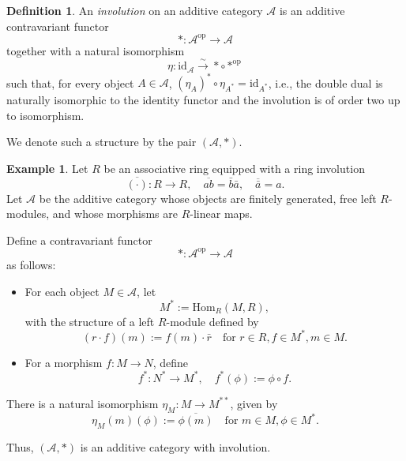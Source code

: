 \documentclass{article}
\theoremstyle{definition}
\newtheorem{defn}[theorem]{Definition}
\newtheorem{exmp}[theorem]{Example}
\begin{document}
\begin{defn}

An \emph{involution} on an additive category \( \mathcal{A} \) is an additive contravariant functor
\[
    * : \mathcal{A}^{\mathrm{op}} \to \mathcal{A}
\]
together with a natural isomorphism
\[
    \eta: \mathrm{id}_{\mathcal{A}} \xrightarrow{\sim} * \circ *^{\mathrm{op}}
\]
such that, for every object \( A \in \mathcal{A} \),  \( (\eta_{A})^* \circ \eta_{A^*} = \mathrm{id}_{A^*} \), i.e., the double dual is naturally isomorphic to the identity functor and the involution is of order two up to isomorphism.

We denote such a structure by the pair \( (\mathcal{A}, *) \).
\end{defn}
\begin{exmp}
Let \( R \) be an associative ring equipped with a ring involution
\[
\overline{(\cdot)} : R \to R, \quad \overline{ab} = \bar{b}\bar{a}, \quad \overline{\bar{a}} = a.
\]
Let \( \mathcal{A} \) be the additive category whose objects are finitely generated, free left \( R \)-modules, and whose morphisms are \( R \)-linear maps.

Define a contravariant functor
\[
* : \mathcal{A}^{\mathrm{op}} \to \mathcal{A}
\]
as follows:

\begin{itemize}
  \item For each object \( M \in \mathcal{A} \), let
  \[
  M^* := \mathrm{Hom}_R(M, R),
  \]
  with the structure of a left \( R \)-module defined by
  \[
  (r \cdot f)(m) := f(m) \cdot \bar{r} \quad \text{for } r \in R, f \in M^*, m \in M.
  \]
  \item For a morphism \( f: M \to N \), define
  \[
  f^* : N^* \to M^*, \quad f^*(\phi) := \phi \circ f.
  \]
\end{itemize}

There is a natural isomorphism \( \eta_M : M \to M^{**} \), given by
\[
\eta_M(m)(\phi) := \overline{\phi(m)} \quad \text{for } m \in M, \phi \in M^*.
\]

Thus, \( (\mathcal{A}, *) \) is an additive category with involution.
\end{exmp}
\end{document}
